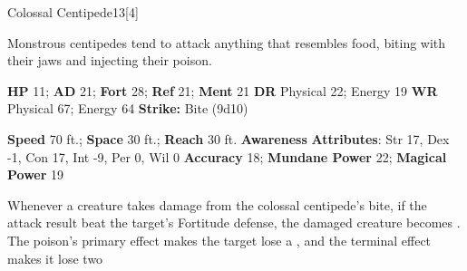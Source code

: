   
  \begin{monsection}{Colossal Centipede}{13}[4]
    \vspace{-1em}\vspace{-1em}
    \vspace{0em}

    
    Monstrous centipedes tend to attack anything that resembles food, biting with their jaws and injecting their poison.
  

    \begin{spellcontent}
      \begin{spelltargetinginfo}
        \pari \textbf{HP} 11;
          \textbf{AD} 21;
          \textbf{Fort} 28;
          \textbf{Ref} 21;
          \textbf{Ment} 21
        \pari \textbf{DR} Physical 22; Energy 19
        \pari \textbf{WR} Physical 67; Energy 64
        \pari \textbf{Strike:}
            Bite  (9d10)
      \end{spelltargetinginfo}
    \end{spellcontent}
    \begin{monsterfooter}
      \pari \textbf{Speed} 70 ft.;
        \textbf{Space} 30 ft.;
        \textbf{Reach} 30 ft.
      \pari \textbf{Awareness} 
      \pari \textbf{Attributes}:
        Str 17, Dex -1,
        Con 17, Int -9,
        Per 0, Wil 0
      \pari \textbf{Accuracy} 18;
        \textbf{Mundane Power} 22;
      \textbf{Magical Power} 19
    \end{monsterfooter}
  \end{monsection}
    Whenever a creature takes damage from the colossal centipede's bite,
      if the attack result beat the target's Fortitude defense,
      the damaged creature becomes .
    The poison's primary effect makes the target lose a , and the terminal effect makes it lose two 
  
